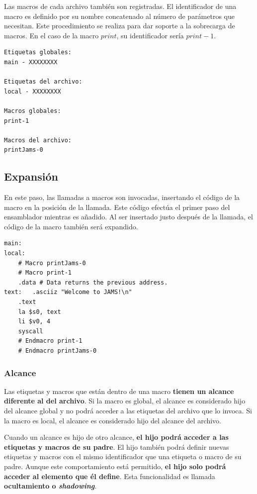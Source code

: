 \noindent Las macros de cada archivo también son registradas.
El identificador de una macro es definido por su nombre concatenado
al número de parámetros que necesitan.
Este procedimiento se realiza para dar soporte a la sobrecarga de macros.
En el caso de la macro $print$, su identificador sería $print-1$.

\begin{lstlisting}[frame=single,label={lst:descubrimiento}]
Etiquetas globales:
main - XXXXXXXX

Etiquetas del archivo:
local - XXXXXXXX

Macros globales:
print-1

Macros del archivo:
printJams-0
\end{lstlisting}

\subsection{Expansión}\label{subsec:expansion}

En este paso, las llamadas a macros son invocadas,
insertando el código de la macro en la posición de la llamada.
Este código efectúa el primer paso del ensamblador mientras es añadido.
Al ser insertado justo después de la llamada, el código de la macro
también será expandido.

\begin{lstlisting}[frame=single,label={lst:expansion}]
main:
local:
    # Macro printJams-0
    # Macro print-1
    .data # Data returns the previous address.
text:   .asciiz "Welcome to JAMS!\n"
    .text
    la $s0, text
    li $v0, 4
    syscall
    # Endmacro print-1
    # Endmacro printJams-0
\end{lstlisting}

\subsubsection{Alcance}\label{subsubsec:alcance}

Las etiquetas y macros que están dentro de una macro
\textbf{tienen un alcance diferente al del archivo}.
Si la macro es global, el alcance es considerado hijo del alcance global
y no podrá acceder a las etiquetas del archivo que lo invoca.
Si la macro es local, el alcance es considerado hijo del alcance del archivo.

\noindent Cuando un alcance es hijo de otro alcance,
\textbf{el hijo podrá acceder a las etiquetas y macros de su padre}.
El hijo también podrá definir nuevas etiquetas y macros con el mismo
identificador que una etiqueta o macro de su padre.
Aunque este comportamiento está permitido, \textbf{el hijo solo podrá acceder
al elemento que él define}.
Esta funcionalidad es llamada \textbf{ocultamiento o \textit{shadowing}}.

